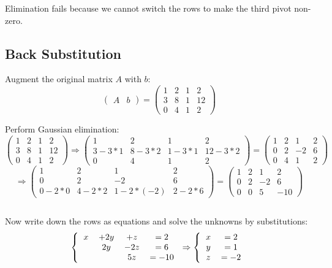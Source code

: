 \documentclass[12pt]{article}
\begin{document}
Elimination fails because we cannot switch the rows to make the third pivot non-zero.

\subsection{Back Substitution}
Augment the original matrix $A$ with $b$:
\[
\left(
    \begin{array}{c|c}
        A & b
    \end{array}
\right)
=
\left(
    \begin{array}{ccc|c}
        1 & 2 & 1 & 2\\ 
        3 & 8 & 1 & 12\\
        0 & 4 & 1 & 2
    \end{array}
\right)
\]

Perform Gaussian elimination:
\[
\left(
    \begin{array}{ccc|c}
        \boxed{1} & 2 & 1 & 2\\ 
        3 & 8 & 1 & 12\\
        0 & 4 & 1 & 2
    \end{array}
\right)
\Rightarrow
\left(
    \begin{array}{ccc|c}
        1 & 2 & 1 & 2\\ 
        3-3*1 & 8-3*2 & 1-3*1 & 12-3*2\\
        0 & 4 & 1 & 2
    \end{array}
\right)
=
\left(
    \begin{array}{ccc|c}
        1 & 2 & 1 & 2\\ 
        0 & \boxed{2} & -2 & 6\\
        0 & 4 & 1 & 2
    \end{array}
\right)
\]
\[
\Rightarrow
\left(
    \begin{array}{ccc|c}
        1 & 2 & 1 & 2\\ 
        0 & 2 & -2 & 6\\
        0-2*0 & 4-2*2 & 1-2*(-2) & 2-2*6
    \end{array}
\right)
=
\left(
    \begin{array}{ccc|c}
        1 & 2 & 1 & 2\\ 
        0 & 2 & -2 & 6\\
        0 & 0 & \boxed{5} & -10
    \end{array}
\right)
\]

$\>$

Now write down the rows as equations and solve the unknowns by substitutions:
\[ 
\left \{
  \begin{tabular}{cccc}
  $x$ & $+2y$ & $+z$ & $=2$\\
  & $2y$ & $-2z$ & $=6$\\
  & & $5z$ & $=-10$\\
  \end{tabular}
\right
.\Rightarrow
\left \{
  \begin{tabular}{cc}
  $x$ & $=2$\\
  $y$ & $=1$\\
  $z$ & $=-2$\\
  \end{tabular}
\right
.\]
\end{document}
